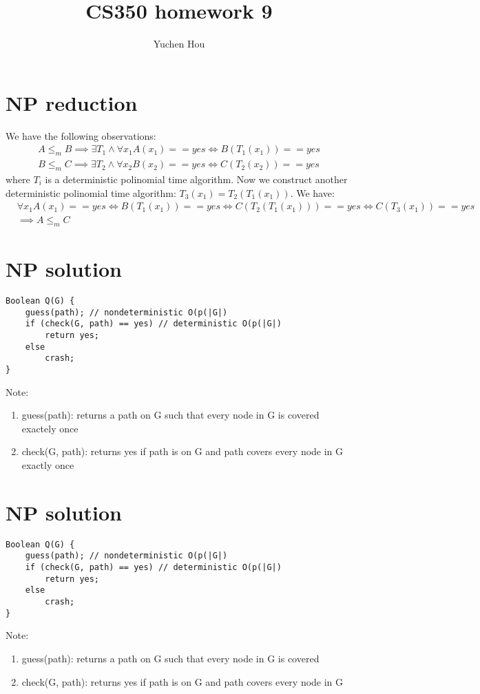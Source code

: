 \documentclass{article}
\begin{document}
\lstset{language=Java, tabsize=4}
\title{CS350 homework 9}
\author{Yuchen Hou}
\maketitle

\section{NP reduction}
We have the following observations:
\begin{align*}
A \leq_m B \implies \exists T_1 \land \forall x_1 A(x_1) == yes \iff B(T_1(x_1))
== yes \\
B \leq_m C \implies \exists T_2 \land \forall x_2 B(x_2) == yes \iff C(T_2(x_2))
== yes
\end{align*}
where $T_i$ is a deterministic polinomial time algorithm. Now we construct
another deterministic polinomial time algorithm: $T_3(x_1) = T_2(T_1(x_1))$. We
have:
\begin{align*}
&\forall x_1 A(x_1) == yes \iff B(T_1(x_1)) == yes \iff C(T_2(T_1(x_1))) == yes
\iff C(T_3(x_1)) == yes \\
&\implies A \leq_m C
\end{align*}

\section{NP solution}
\begin{lstlisting}
Boolean Q(G) {
	guess(path); // nondeterministic O(p(|G|)
	if (check(G, path) == yes) // deterministic O(p(|G|)
		return yes;
	else
		crash;
}
\end{lstlisting}
Note:
\begin{enumerate}
  \item guess(path): returns a path on G such that every node in G is covered
  exactely once
  \item check(G, path): returns yes if path is on G and path covers every node
  in G exactly once
\end{enumerate}

\section{NP solution}
\begin{lstlisting}
Boolean Q(G) {
	guess(path); // nondeterministic O(p(|G|)
	if (check(G, path) == yes) // deterministic O(p(|G|)
		return yes;
	else
		crash;
}
\end{lstlisting}
Note:
\begin{enumerate}
  \item guess(path): returns a path on G such that every node in G is covered
  \item check(G, path): returns yes if path is on G and path covers every node
  in G
\end{enumerate}
\end{document}
